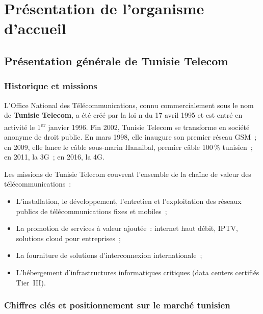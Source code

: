 \documentclass[12pt,a4paper]{report}
\begin{document}
\chapter{Pr\'esentation de l'organisme d'accueil}

\section{Pr\'esentation g\'en\'erale de Tunisie Telecom}

\subsection{Historique et missions}

L'Office National des T\'el\'ecommunications, connu commercialement sous le nom de
\textbf{Tunisie Telecom}, a \'et\'e cr\'e\'e par la loi n du 17 avril
1995 et est entr\'e en activit\'e le 1\textsuperscript{er} janvier 1996. Fin 2002,
Tunisie Telecom se transforme en soci\'et\'e anonyme de droit public. En mars 1998,
elle inaugure son premier r\'eseau GSM~; en 2009, elle lance le c\^able sous-marin
Hannibal, premier c\^able 100\,\% tunisien~; en 2011, la 3G~; en 2016, la 4G.

Les missions de Tunisie Telecom couvrent l'ensemble de la cha\^ine de valeur des
t\'el\'ecommunications~:
\begin{itemize}[leftmargin=*]
  \item L'installation, le d\'eveloppement, l'entretien et l'exploitation des
        r\'eseaux publics de t\'el\'ecommunications fixes et mobiles~;
  \item La promotion de services \`a valeur ajout\'ee~: internet haut d\'ebit,
        IPTV, solutions cloud pour entreprises~;
  \item La fourniture de solutions d'interconnexion internationale~;
  \item L'h\'ebergement d'infrastructures informatiques critiques (data centers
        certifi\'es Tier~III).
\end{itemize}

\subsection{Chiffres cl\'es et positionnement sur le march\'e tunisien}
\end{document}
